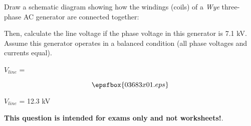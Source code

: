 

Draw a schematic diagram showing how the windings (coils) of a {\it Wye} three-phase AC generator are connected together:

\vskip 100pt

Then, calculate the line voltage if the phase voltage in this generator is 7.1 kV.  Assume this generator operates in a balanced condition (all phase voltages and currents equal).

\vskip 10pt

$V_{line}$ = 







$$\epsfbox{03683x01.eps}$$

$V_{line}$ = 12.3 kV







{\bf This question is intended for exams only and not worksheets!}.



